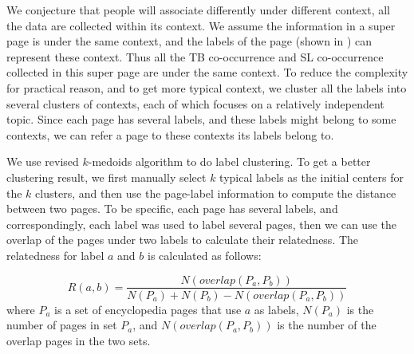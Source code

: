 We conjecture that people will associate differently under different context,
all the data are collected within its context. We assume the information in
a super page is under the same context, and the labels of the page
(shown in )
can represent these context. Thus all the TB co-occurrence and SL
co-occurrence collected in this super page are under the same context.
To reduce the complexity for practical reason,
and to get more typical context, we cluster all the labels into
several clusters of contexts,
each of which focuses on a relatively independent topic.
Since each page has several labels, and these labels might belong
to some contexts, we can refer a page to these contexts
its labels belong to.

We use revised $k$-medoids algorithm to do label clustering.
To get a better clustering result,
we first manually select $k$ typical labels as the initial centers for
the $k$ clusters, and then use the page-label information to
compute the distance between two pages.
To be specific, each page has several labels, and correspondingly,
each label was used to label several pages, then we can use
the overlap of the pages under two labels to calculate their
relatedness. The relatedness for label $a$ and $b$ is calculated as follows:

\begin{equation}
R(a,b)=\frac{N(overlap(P_a,P_b))}{N(P_a)+N(P_b)-N(overlap(P_a,P_b))}
\end{equation}
where $P_a$ is a set of encyclopedia pages that use $a$ as labels,
$N(P_a)$ is the number of pages in set $P_a$, and $N(overlap(P_a,P_b))$
is the number of the overlap pages in the two sets.
